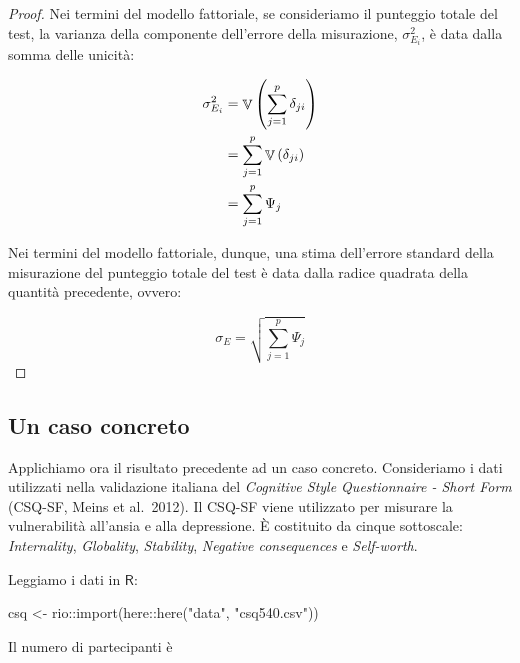 \documentclass[
  11pt,
]{krantz}
\makeatletter
\newenvironment{Shaded}{\begin{snugshade}}{\end{snugshade}}
\newcommand{\FunctionTok}[1]{\textcolor[rgb]{0,0,0}{#1}}
\newcommand{\NormalTok}[1]{#1}
\newcommand{\OtherTok}[1]{\textcolor[rgb]{0.37,0.37,0.37}{#1}}
\newcommand{\SpecialCharTok}[1]{\textcolor[rgb]{0,0,0}{#1}}
\newcommand{\StringTok}[1]{\textcolor[rgb]{0.5,0.5,0.5}{#1}}
\newenvironment{kframe}{%
\medskip{}
\setlength{\fboxsep}{.8em}
 \def\at@end@of@kframe{}%
 \ifinner\ifhmode%
  \def\at@end@of@kframe{\end{minipage}}%
  \begin{minipage}{\columnwidth}%
 \fi\fi%
 \def\FrameCommand##1{\hskip\@totalleftmargin \hskip-\fboxsep
 \colorbox{shadecolor}{##1}\hskip-\fboxsep
     \hskip-\linewidth \hskip-\@totalleftmargin \hskip\columnwidth}%
 \MakeFramed {\advance\hsize-\width
   \@totalleftmargin\z@ \linewidth\hsize
   \@setminipage}}%
 {\par\unskip\endMakeFramed%
 \at@end@of@kframe}
\renewenvironment{Shaded}{\begin{kframe}}{\end{kframe}}
\DeclareMathOperator{\V}{\mathbb{V}} %
\theoremstyle{definition}
\theoremstyle{definition}
\theoremstyle{definition}
\theoremstyle{definition}
\theoremstyle{remark}
\makeatother
\begin{document}
\begin{proof}
Nei termini del modello fattoriale, se consideriamo il punteggio totale del test, la varianza della componente dell'errore della misurazione, \(\sigma^2_{E_i}\), è data dalla somma delle unicità:

\begin{equation}
\begin{aligned}
 \sigma^2_{E_i} &= \V\left( \sum_{j=1}^p \delta_{ji} \right)\notag\\
 &= \sum_{j=1}^p \V\left( \delta_{ji} \right)\notag\\
 &= \sum_{j=1}^p \Psi_j\notag
\end{aligned}
\end{equation}

Nei termini del modello fattoriale, dunque, una stima dell'errore standard della misurazione del punteggio totale del test è data dalla radice quadrata della quantità precedente, ovvero:

\begin{equation}
\sigma_{E} = \sqrt{\sum_{j=1}^p \Psi_j}
\label{eq:err-stnd-meas-FA}
\end{equation}
\end{proof}

\hypertarget{un-caso-concreto}{%
\subsection{Un caso concreto}\label{un-caso-concreto}}

Applichiamo ora il risultato precedente ad un caso concreto. Consideriamo i dati utilizzati nella validazione italiana del \emph{Cognitive Style Questionnaire - Short Form} (CSQ-SF, Meins et al.~2012). Il CSQ-SF viene utilizzato per misurare la vulnerabilità all'ansia e alla depressione. È costituito da cinque sottoscale: \emph{Internality}, \emph{Globality}, \emph{Stability}, \emph{Negative consequences} e \emph{Self-worth}.

Leggiamo i dati in \(\textsf{R}\):

\begin{Shaded}
\begin{Highlighting}[]
\NormalTok{csq }\OtherTok{\textless{}{-}}\NormalTok{ rio}\SpecialCharTok{::}\FunctionTok{import}\NormalTok{(here}\SpecialCharTok{::}\FunctionTok{here}\NormalTok{(}\StringTok{"data"}\NormalTok{, }\StringTok{"csq540.csv"}\NormalTok{))}
\end{Highlighting}
\end{Shaded}

Il numero di partecipanti è
\end{document}
